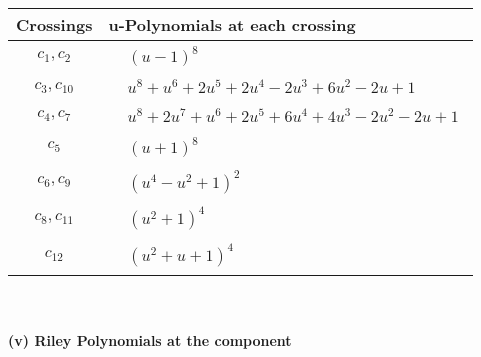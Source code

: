 \documentclass[1p]{elsarticle_modified}
\theoremstyle{definition}
\begin{document}
\begin{tabular}{m{50pt}|m{274pt}}
Crossings & \hspace{64pt}u-Polynomials at each crossing \\
\hline $$\begin{aligned}c_{1},c_{2}\end{aligned}$$&$\begin{aligned}
&(u-1)^8
\end{aligned}$\\
\hline $$\begin{aligned}c_{3},c_{10}\end{aligned}$$&$\begin{aligned}
&u^8+u^6+2 u^5+2 u^4-2 u^3+6 u^2-2 u+1
\end{aligned}$\\
\hline $$\begin{aligned}c_{4},c_{7}\end{aligned}$$&$\begin{aligned}
&u^8+2 u^7+u^6+2 u^5+6 u^4+4 u^3-2 u^2-2 u+1
\end{aligned}$\\
\hline $$\begin{aligned}c_{5}\end{aligned}$$&$\begin{aligned}
&(u+1)^8
\end{aligned}$\\
\hline $$\begin{aligned}c_{6},c_{9}\end{aligned}$$&$\begin{aligned}
&(u^4- u^2+1)^2
\end{aligned}$\\
\hline $$\begin{aligned}c_{8},c_{11}\end{aligned}$$&$\begin{aligned}
&(u^2+1)^4
\end{aligned}$\\
\hline $$\begin{aligned}c_{12}\end{aligned}$$&$\begin{aligned}
&(u^2+u+1)^4
\end{aligned}$\\
\hline
\end{tabular}\\~\\
\newpage\renewcommand{\arraystretch}{1}
\flushleft \textbf{(v) Riley Polynomials at the component}\newline \\
\end{document}
